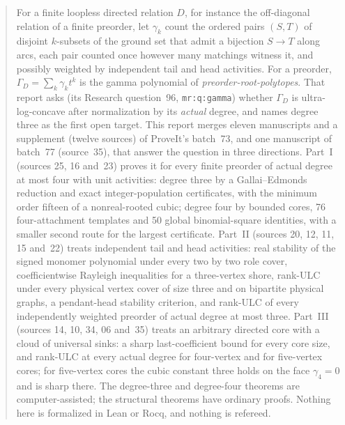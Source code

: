 \documentclass[11pt]{article}
\numberwithin{equation}{section}
\theoremstyle{definition}\newtheorem{definition}[theorem]{Definition}\newtheorem{remark}[theorem]{Remark}
\newcommand{\Ga}{\Gamma}                   %
\newcommand{\prp}{\emph{preorder-root-polytopes}}
\begin{document}
\begin{abstract}
For a finite loopless directed relation $D$, for instance the off-diagonal
relation of a finite preorder, let $\gamma_k$ count the ordered pairs $(S,T)$
of disjoint $k$-subsets of the ground set that admit a bijection
$S\to T$ along arcs, each pair counted once however many matchings witness
it, and possibly weighted by independent tail and head activities. For a
preorder, $\Ga_D=\sum_k\gamma_kt^k$ is the gamma polynomial of
\prp. That report asks (its Research question~96, \texttt{mr:q:gamma})
whether $\Ga_D$ is ultra-log-concave after normalization by its
\emph{actual} degree, and names degree three as the first open target. This
report merges eleven manuscripts and a supplement (twelve sources) of %
ProveIt's batch~73, and one manuscript of batch~77 (source~35), that %
answer the question in three directions.
Part~I (sources 25, 16 and~23) proves it for every finite preorder of actual
degree at most four with unit activities: degree three by a
Gallai--Edmonds reduction and exact integer-population certificates, with
the minimum order fifteen of a nonreal-rooted cubic; degree four by bounded
cores, 76 four-attachment templates and 50 global binomial-square
identities, with a smaller second route for the largest certificate.
Part~II (sources 20, 12, 11, 15 and~22) treats independent tail and head
activities: real stability of the signed monomer polynomial under every two
by two role cover, coefficientwise Rayleigh inequalities for a three-vertex
shore, rank-ULC under every physical vertex cover of size three and on
bipartite physical graphs, a pendant-head stability criterion, and rank-ULC
of every independently weighted preorder of actual degree at most three.
Part~III (sources 14, 10, 34, 06 and~35) treats an arbitrary directed core with a
cloud of universal sinks: a sharp last-coefficient bound for every core
size, and rank-ULC at every actual degree for four-vertex and for %
five-vertex cores; for five-vertex cores the cubic constant three holds
on the face $\gamma_4=0$ and is sharp there.
The degree-three and degree-four theorems are computer-assisted; the
structural theorems have ordinary proofs. Nothing here is formalized in
Lean or Rocq, and nothing is refereed.
\end{abstract}

\tableofcontents
\end{document}
